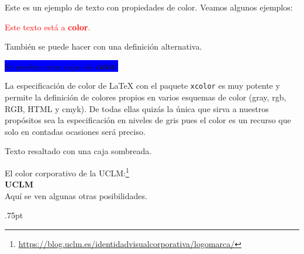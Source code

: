 \documentclass[11pt,a4paper]{article}
\begin{document}
Este es un ejemplo de texto con propiedades de color. Veamos algunos ejemplos:

\textcolor{red}{Este texto está a \textbf{color}.}

También se puede hacer {\color{green} con una definición alternativa.}

\colorbox{blue}{Se pueden crear cajas de {\color{yellow}\textbf{color}}.}

La especificación de color de \LaTeX{} con el paquete \texttt{xcolor} es muy potente y permite la definición de colores propios en varios esquemas de color (gray, rgb, RGB, HTML y cmyk). De todas ellas quizás la única que sirva a nuestros propósitos sea la especificación en niveles de gris pues el color es un recurso que solo en contadas ocasiones será preciso.


\colorbox{sombra}{Texto resaltado con una caja sombreada.}

\setlength{\fboxrule}{4pt}

\setlength{\fboxrule}{0.5pt} %
\begin{center}
\end{center}

\noindent El color corporativo de la UCLM:\footnote{\url{https://blog.uclm.es/identidadvisualcorporativa/logomarca/}}\\

\colorbox{UCLMred}{\Huge \color{white}\textsf{\textbf{UCLM}}}\\


\noindent Aquí se ven algunas otras posibilidades.

\newcount\WL \unitlength.75pt
\end{document}
